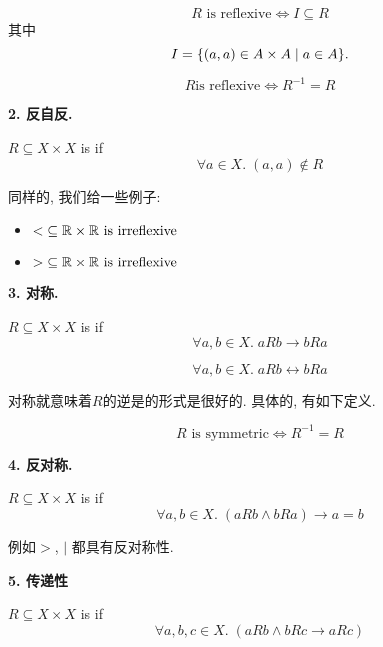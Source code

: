 \begin{theorem}
  \[
    R \text{ is reflexive} \iff I \subseteq R
  \]
  其中
  $$I = \{(a, a) \in A \times A \mid a \in A\}.$$
\end{theorem}

\begin{theorem}
  \[R \text{is reflexive} \iff R^{-1}=R\]
\end{theorem}


\textbf{2. 反自反. }

\begin{definition}
  $R \subseteq X \times X$ is  if
  \[
    \forall a \in X.\; (a, a) \notin R
  \]
\end{definition}

同样的, 我们给一些例子: 
\begin{itemize}
  \item $< \;\subseteq \mathbb{R} \times \mathbb{R} \text{ is irreflexive}$
  \item $> \;\subseteq \mathbb{R} \times \mathbb{R} \text{ is irreflexive}$
\end{itemize}

\textbf{3. 对称. }

\begin{definition}[对称 (Symmetric)]
  $R \subseteq X \times X$ is  if
  \[
    \forall a, b \in X.\; a R b \to b R a
  \]

  

  \[
    \forall a, b \in X.\; a R b \leftrightarrow b R a
  \]
\end{definition}

对称就意味着$R$的逆是的形式是很好的. 具体的, 有如下定义. 
\begin{theorem}
  $$R \text{ is symmetric} \iff R^{-1} = R$$
\end{theorem}

\textbf{4. 反对称. }

\begin{definition}
  $R \subseteq X \times X$ is  if
  \[
    \forall a, b \in X.\; (a R b \land b R a) \to a = b
  \]
\end{definition}

例如$>$, $|$ 都具有反对称性. 

\textbf{5. 传递性}

\begin{definition}
  $R \subseteq X \times X$ is  if
  \[
    \forall a, b, c \in X.\; (a R b \land b R c \to a R c)
  \]

  

\end{definition}


